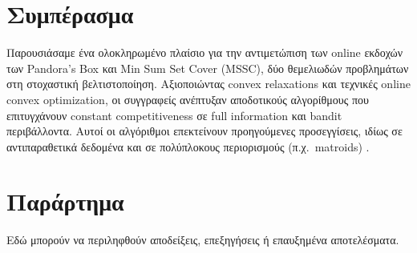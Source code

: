 \documentclass[11pt,a4paper]{article}
\begin{document}
\section{Συμπέρασμα}
Παρουσιάσαμε ένα ολοκληρωμένο πλαίσιο για την αντιμετώπιση των online εκδοχών των Pandora’s Box και Min Sum Set Cover (MSSC), δύο θεμελιωδών προβλημάτων στη στοχαστική βελτιστοποίηση. Αξιοποιώντας convex relaxations και τεχνικές online convex optimization, οι συγγραφείς ανέπτυξαν αποδοτικούς αλγορίθμους που επιτυγχάνουν constant competitiveness σε full information και bandit περιβάλλοντα. Αυτοί οι αλγόριθμοι επεκτείνουν προηγούμενες προσεγγίσεις, ιδίως σε αντιπαραθετικά δεδομένα και σε πολύπλοκους περιορισμούς (π.χ.\ matroids) \cite{gergatsouli2022online}.

\appendix
\section{Παράρτημα}
Εδώ μπορούν να περιληφθούν αποδείξεις, επεξηγήσεις ή επαυξημένα αποτελέσματα.



\end{document}
